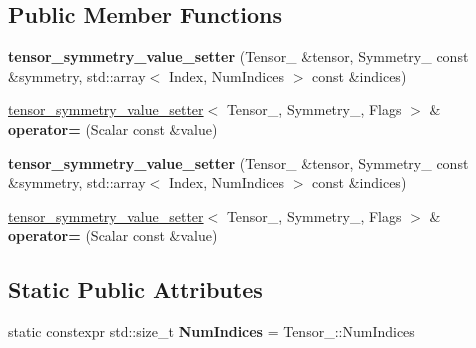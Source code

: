 \subsection*{Public Member Functions}
\begin{DoxyCompactItemize}
\item 
\mbox{\label{class_eigen_1_1internal_1_1tensor__symmetry__value__setter_a7a51979ed3bc5b0c256d32892af1071e}} 
{\bfseries tensor\+\_\+symmetry\+\_\+value\+\_\+setter} (Tensor\+\_\+ \&tensor, Symmetry\+\_\+ const \&symmetry, std\+::array$<$ Index, Num\+Indices $>$ const \&indices)
\item 
\mbox{\label{class_eigen_1_1internal_1_1tensor__symmetry__value__setter_a1c3cddacc57db46227537be17174108d}} 
\hyperlink{class_eigen_1_1internal_1_1tensor__symmetry__value__setter}{tensor\+\_\+symmetry\+\_\+value\+\_\+setter}$<$ Tensor\+\_\+, Symmetry\+\_\+, Flags $>$ \& {\bfseries operator=} (Scalar const \&value)
\item 
\mbox{\label{class_eigen_1_1internal_1_1tensor__symmetry__value__setter_a7a51979ed3bc5b0c256d32892af1071e}} 
{\bfseries tensor\+\_\+symmetry\+\_\+value\+\_\+setter} (Tensor\+\_\+ \&tensor, Symmetry\+\_\+ const \&symmetry, std\+::array$<$ Index, Num\+Indices $>$ const \&indices)
\item 
\mbox{\label{class_eigen_1_1internal_1_1tensor__symmetry__value__setter_a1c3cddacc57db46227537be17174108d}} 
\hyperlink{class_eigen_1_1internal_1_1tensor__symmetry__value__setter}{tensor\+\_\+symmetry\+\_\+value\+\_\+setter}$<$ Tensor\+\_\+, Symmetry\+\_\+, Flags $>$ \& {\bfseries operator=} (Scalar const \&value)
\end{DoxyCompactItemize}
\subsection*{Static Public Attributes}
\begin{DoxyCompactItemize}
\item 
\mbox{\label{class_eigen_1_1internal_1_1tensor__symmetry__value__setter_af1e2da9b7b3d74fbd2bb175a141bf0ac}} 
static constexpr std\+::size\+\_\+t {\bfseries Num\+Indices} = Tensor\+\_\+\+::\+Num\+Indices
\end{DoxyCompactItemize}



